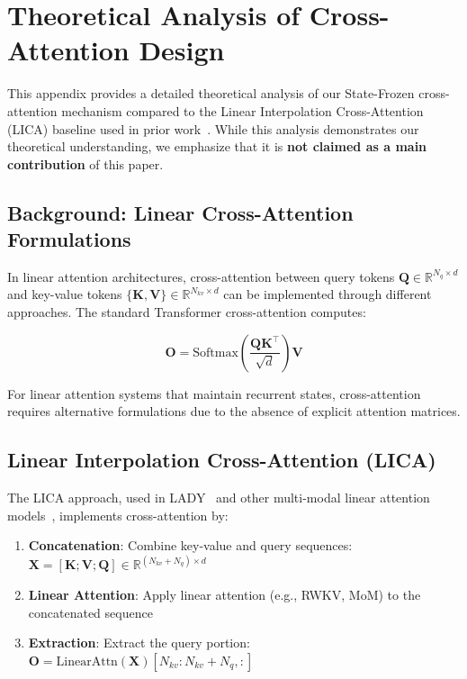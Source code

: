 
\section{Theoretical Analysis of Cross-Attention Design}
\label{appendix:cross_attention}

This appendix provides a detailed theoretical analysis of our State-Frozen cross-attention mechanism compared to the Linear Interpolation Cross-Attention (LICA) baseline used in prior work~\cite{lady}. While this analysis demonstrates our theoretical understanding, we emphasize that it is \textbf{not claimed as a main contribution} of this paper.

\subsection{Background: Linear Cross-Attention Formulations}

In linear attention architectures, cross-attention between query tokens $\mathbf{Q} \in \mathbb{R}^{N_q \times d}$ and key-value tokens $\{\mathbf{K}, \mathbf{V}\} \in \mathbb{R}^{N_{kv} \times d}$ can be implemented through different approaches. The standard Transformer cross-attention computes:

\begin{equation}
\mathbf{O} = \text{Softmax}\left(\frac{\mathbf{Q}\mathbf{K}^\top}{\sqrt{d}}\right) \mathbf{V}
\label{eq:standard_cross_attn}
\end{equation}

For linear attention systems that maintain recurrent states, cross-attention requires alternative formulations due to the absence of explicit attention matrices.

\subsection{Linear Interpolation Cross-Attention (LICA)}

The LICA approach, used in LADY~\cite{lady} and other multi-modal linear attention models~\cite{vl_mamba, cobra, visual_rwkv}, implements cross-attention by:

\begin{enumerate}
    \item \textbf{Concatenation}: Combine key-value and query sequences: $\mathbf{X} = [\mathbf{K}; \mathbf{V}; \mathbf{Q}] \in \mathbb{R}^{(N_{kv} + N_q) \times d}$
    \item \textbf{Linear Attention}: Apply linear attention (e.g., RWKV, MoM) to the concatenated sequence
    \item \textbf{Extraction}: Extract the query portion: $\mathbf{O} = \text{LinearAttn}(\mathbf{X})[N_{kv}:N_{kv}+N_q, :]$
\end{enumerate}

